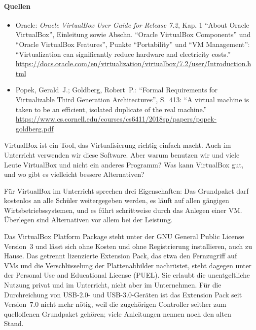 \paragraph{Quellen}
\begin{itemize}[quellen]
  \item Oracle: \emph{Oracle VirtualBox User Guide for Release 7.2}, Kap. 1 \enquote{About Oracle VirtualBox}, Einleitung sowie Abschn. \enquote{Oracle VirtualBox Components} und \enquote{Oracle VirtualBox Features}, Punkte \enquote{Portability} und \enquote{VM Management}: \enquote{Virtualization can significantly reduce hardware and electricity costs.} \url{https://docs.oracle.com/en/virtualization/virtualbox/7.2/user/Introduction.html}
  \item Popek, Gerald~J.; Goldberg, Robert~P.: \enquote{Formal Requirements for Virtualizable Third Generation Architectures}, S.~413: \enquote{A virtual machine is taken to be an efficient, isolated duplicate of the real machine.} \url{https://www.cs.cornell.edu/courses/cs6411/2018sp/papers/popek-goldberg.pdf}
\end{itemize}

\begin{aufgabe}
VirtualBox ist ein Tool, das Virtualisierung richtig einfach macht. Auch im Unterricht verwenden wir diese Software. Aber warum benutzen wir und viele Leute VirtualBox und nicht ein anderes Programm? Was kann VirtualBox gut, und wo gibt es vielleicht bessere Alternativen?
\end{aufgabe}
\label{sec:virtualbox}

Für VirtualBox im Unterricht sprechen drei Eigenschaften: Das Grundpaket darf kostenlos an alle Schüler weitergegeben werden, es läuft auf allen gängigen Wirtsbetriebssystemen, und es führt schrittweise durch das Anlegen einer VM. Überlegen sind Alternativen vor allem bei der Leistung.

Das VirtualBox Platform Package steht unter der GNU General Public License Version~3 und lässt sich ohne Kosten und ohne Registrierung installieren, auch zu Hause. Das getrennt lizenzierte Extension Pack, das etwa den Fernzugriff auf VMs und die Verschlüsselung der Plattenabbilder nachrüstet, steht dagegen unter der Personal Use and Educational License (PUEL). Sie erlaubt die unentgeltliche Nutzung privat und im Unterricht, nicht aber im Unternehmen. Für die Durchreichung von USB-2.0- und USB-3.0-Geräten ist das Extension Pack seit Version~7.0 nicht mehr nötig, weil die zugehörigen Controller seither zum quelloffenen Grundpaket gehören; viele Anleitungen nennen noch den alten Stand.


